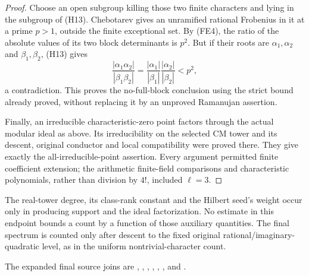 \begin{proof}
Choose an open subgroup killing those two finite characters
and lying in the subgroup of (H13).
Chebotarev gives an unramified rational Frobenius in it at
a prime \(p>1\), outside the finite exceptional set.
By (FE4), the ratio of the absolute values of its two block
determinants is \(p^2\).
But if their roots are \(\alpha_1,\alpha_2\) and
\(\beta_1,\beta_2\), (H13) gives
\[
 \frac{|\alpha_1\alpha_2|}{|\beta_1\beta_2|}
       =\frac{|\alpha_1|}{|\beta_1|}
          \frac{|\alpha_2|}{|\beta_2|}<p^2,
\]
a contradiction. This proves the no-full-block conclusion
using the strict bound already proved, without replacing
it by an unproved Ramanujan assertion.

Finally, an irreducible characteristic-zero point factors
through the actual modular ideal as above.
Its irreducibility on the selected CM tower and its descent,
original conductor and local compatibility were proved
there. They give exactly the all-irreducible-point assertion.
Every argument permitted finite coefficient extension;
the arithmetic finite-field comparisons and characteristic
polynomials, rather than division by \(4!\), included
\(\ell=3\).
\end{proof}

The real-tower degree, its class-rank constant and the Hilbert
seed's weight occur only in producing support and the ideal
factorization. No estimate in this endpoint bounds a count
by a function of those auxiliary quantities.
The final spectrum is counted only after descent to the
fixed original rational/imaginary-quadratic level, as in
the uniform nontrivial-character count.

The expanded final source joins are
,
,
,
, ,
, and
.
